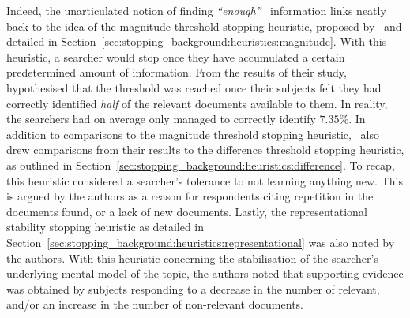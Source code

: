 Indeed, the unarticulated notion of finding \emph{``enough''}~\citep{zach2005enough_is_enough} information links neatly back to the idea of the magnitude threshold stopping heuristic, proposed by~\cite{nickles1995judgment} and detailed in Section~\ref{sec:stopping_background:heuristics:magnitude}. With this heuristic, a searcher would stop once they have accumulated a certain predetermined amount of information. From the results of their study,~\cite{dostert2009satisficing} hypothesised that the threshold was reached once their subjects felt they had correctly identified \emph{half} of the relevant documents available to them. In reality, the searchers had on average only managed to correctly identify $7.35\%$. In addition to comparisons to the magnitude threshold stopping heuristic,~\cite{dostert2009satisficing} also drew comparisons from their results to the difference threshold stopping heuristic, as outlined in Section~\ref{sec:stopping_background:heuristics:difference}. To recap, this heuristic considered a searcher's tolerance to not learning anything new. This is argued by the authors as a reason for respondents citing repetition in the documents found, or a lack of new documents. Lastly, the representational stability stopping heuristic as detailed in Section~\ref{sec:stopping_background:heuristics:representational} was also noted by the authors. With this heuristic concerning the stabilisation of the searcher's underlying mental model of the topic, the authors noted that supporting evidence was obtained by subjects responding to a decrease in the number of relevant, and/or an increase in the number of non-relevant documents.

